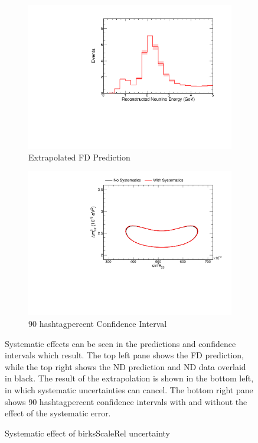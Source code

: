 {\begin{figure}
\begin{center}
\begin{subfigure}[c]{0.49\textwidth}
\includegraphics[width=\textwidth]{figures/systs/prediction/fd_extrap_prediction_birksScaleRel.pdf}
\caption*{Extrapolated FD Prediction}
\end{subfigure}
\begin{subfigure}[c]{0.49\textwidth}
\includegraphics[width=\textwidth]{figures/systs/prediction/fd_extrap_contour_birksScaleRel.pdf}
\caption*{90 hashtagpercent Confidence Interval}
\end{subfigure}
\end{center}
\caption{Systematic effect of birksScaleRel uncertainty}{
Systematic effects can be seen in the predictions and confidence intervals
which result.
The top left pane shows the FD prediction, while the top right shows the
ND prediction and ND data overlaid in black.
The result of the extrapolation is shown in the bottom left, in which
systematic uncertainties can cancel.
The bottom right pane shows 90 hashtagpercent confidence intervals with and without
the effect of the systematic error.}
\label{syst_fig_birksScaleRel}


\end{figure}}
